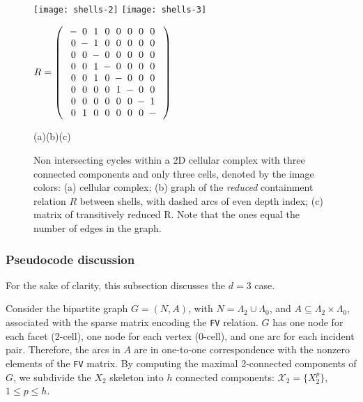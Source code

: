 \begin{figure}[htbp] %
   \centering
   \texttt{[image: shells-2]} 
   \hspace{2mm}
   \texttt{[image: shells-3]} 
   \hspace{2mm}
\begin{minipage}[c]{0.3\textwidth}
	\vspace{-3.2cm}
	\small{$R = \mat{
	{\arraycolsep=1.9pt%
	\begin{array}
	{cccccccc}
		- & 0 & 1 & 0 & 0 & 0 & 0 & 0  \\
		0 & - & 1 & 0 & 0 & 0 & 0 & 0  \\
		0 & 0 & - & 0 & 0 & 0 & 0 & 0  \\
		0 & 0 & 1 & - & 0 & 0 & 0 & 0  \\
		0 & 0 & 1 & 0 & - & 0 & 0 & 0  \\
		0 & 0 & 0 & 0 & 1 & - & 0 & 0  \\
		0 & 0 & 0 & 0 & 0 & 0 & - & 1  \\
		0 & 1 & 0 & 0 & 0 & 0 & 0 & -  \\	 
	\end{array}}}$}
\end{minipage}

\vspace{-1.5mm}
{\footnotesize\hspace{.2\textwidth}(a)\hfill(b)\hfill(c)\hspace{.2\textwidth}}
\vspace{-2.5mm}
   \caption{Non intersecting cycles within a 2D cellular complex with three connected components and only three cells, denoted by the image colors: (a) cellular complex; (b) graph of the \emph{reduced} containment relation $R$ between shells, with dashed arcs of even depth index; (c) matrix of transitively reduced R. Note that the ones equal the number of edges in the graph. }
   \label{fig:shells}
\end{figure}

\subsubsection{Pseudocode discussion}
For the sake of clarity, this subsection discusses the $d=3$ case.

Consider the bipartite graph {$G = (N, A)$, with $N= \Lambda_2 \cup \Lambda_0$, and $A \subseteq \Lambda_2 \times \Lambda_0$,} associated with the sparse matrix encoding the \texttt{FV} relation. $G$ has one node for each facet (2-cell), one node for each vertex (0-cell), and one arc for each incident pair. Therefore, the arcs in $A$ are in one-to-one correspondence with the nonzero elements of the \texttt{FV} matrix. By computing the {maximal} 2-connected components of $G$, we subdivide the $X_2$ skeleton into $h$ connected components: $\mathcal{X}_2 = \{ {X}_2^p \}$, {$1\leq p\leq h$.}

